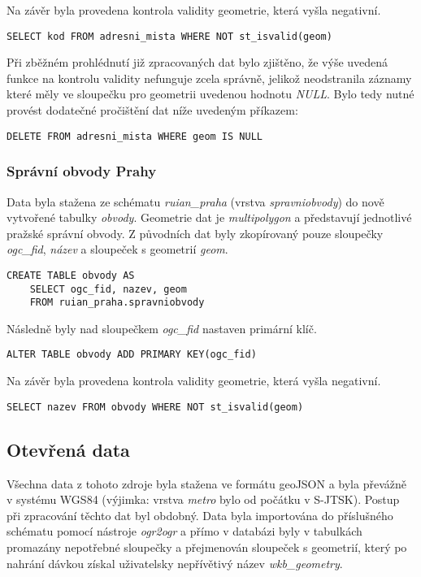 \documentclass[a4paper, 12pt]{article}
\begin{document}
Na závěr byla provedena kontrola validity geometrie, která vyšla negativní.
\begin{lstlisting}
SELECT kod FROM adresni_mista WHERE NOT st_isvalid(geom)
\end{lstlisting}
Při zběžném prohlédnutí již zpracovaných dat bylo zjištěno, že výše uvedená funkce na kontrolu validity nefunguje zcela správně, jelikož neodstranila záznamy které měly ve sloupečku pro geometrii uvedenou hodnotu \textit{NULL}. Bylo tedy nutné provést dodatečné pročištění dat níže uvedeným příkazem:
\begin{lstlisting}
DELETE FROM adresni_mista WHERE geom IS NULL
\end{lstlisting}

\subsubsection*{Správní obvody Prahy}
Data byla stažena ze schématu \textit{ruian\_praha} (vrstva \textit{spravniobvody}) do nově vytvořené tabulky \textsl{obvody}. Geometrie dat je \textit{multipolygon} a představují jednotlivé pražské správní obvody. Z původních dat byly zkopírovaný pouze sloupečky \textsl{ogc\_fid}, \textsl{název} a sloupeček s geometrií \textsl{geom}. 
\begin{lstlisting}
CREATE TABLE obvody AS
    SELECT ogc_fid, nazev, geom
    FROM ruian_praha.spravniobvody
\end{lstlisting}

Následně byly nad sloupečkem \textsl{ogc\_fid} nastaven primární klíč.
\begin{lstlisting}
ALTER TABLE obvody ADD PRIMARY KEY(ogc_fid)
\end{lstlisting}

Na závěr byla provedena kontrola validity geometrie, která vyšla negativní.
\begin{lstlisting}
SELECT nazev FROM obvody WHERE NOT st_isvalid(geom)
\end{lstlisting}

\subsection{Otevřená data}
Všechna data z tohoto zdroje byla stažena ve formátu geoJSON a byla převážně v systému WGS84 (výjimka: vrstva \textit{metro} bylo od počátku v S-JTSK). Postup při zpracování těchto dat byl obdobný. Data byla importována do příslušného schématu pomocí nástroje \textit{ogr2ogr} a přímo v databázi byly v tabulkách promazány nepotřebné sloupečky a přejmenován sloupeček s geometrií, který po nahrání dávkou získal uživatelsky nepřívětivý název \textit{wkb\_ge\-o\-metry}.\\
\end{document}
